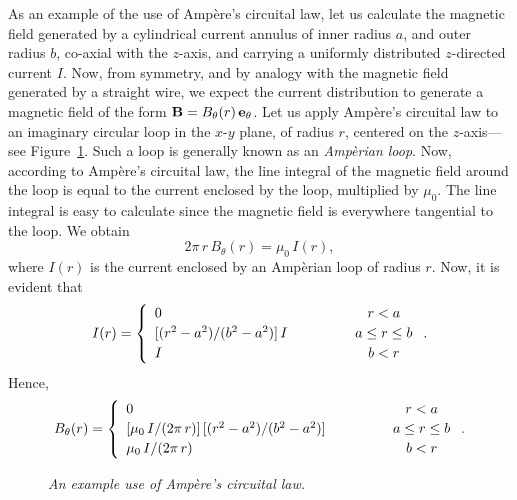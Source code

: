 As an example of the use of Amp\`{e}re's circuital law, let us calculate the magnetic field
generated by a cylindrical current annulus of inner radius $a$,
and outer radius $b$, co-axial with the $z$-axis, and carrying a uniformly
distributed $z$-directed current $I$. Now, from symmetry, and by analogy
with the magnetic field generated by a straight wire, we expect the current distribution to generate a 
magnetic field of the form ${\bf B}= B_\theta(r)\,{\bf e}_\theta$. 
Let us apply Amp\`{e}re's circuital law to an imaginary circular loop in the $x$-$y$ plane, of radius
$r$, centered on the $z$-axis---see Figure~\ref{famp}. Such a loop is generally known as an {\em Amp\`{e}rian loop}. Now, according to
Amp\`{e}re's circuital law, the line integral of the magnetic field around the loop is equal to
the  current enclosed by the loop, multiplied by $\mu_0$. The line integral is easy to calculate since the magnetic field is everywhere tangential to the
loop. We obtain
$$
2\pi\,r\,B_\theta(r) = \mu_0\,I(r),
$$
where $I(r)$ is the current enclosed by  an Amp\`{e}rian loop of radius $r$.
Now, it is evident that
\begin{equation}
I(r) = \left\{ 
\begin{array}{lcc}
0&\mbox{\hspace{1cm}}&r<a\\[0.5ex]
[(r^2-a^2)/(b^2-a^2)]\, I&&a\leq r\leq b\\[0.5ex]
I&&b<r
\end{array}
\right..
\end{equation}
Hence,
\begin{equation}\label{eamp1}
B_\theta(r) = \left\{ 
\begin{array}{lcc}
0&\mbox{\hspace{1cm}}&r<a\\[0.5ex]
[\mu_0\,I/(2\pi\,r)]\,[(r^2-a^2)/(b^2-a^2)]&&a\leq r\leq b\\[0.5ex]
\mu_0\,I/(2\pi\,r)&&b<r
\end{array}
\right..
\end{equation}
\begin{figure}
\centerline{}
\caption{\em An example use of Amp\`{e}re's circuital law.}\label{famp}
\end{figure}

